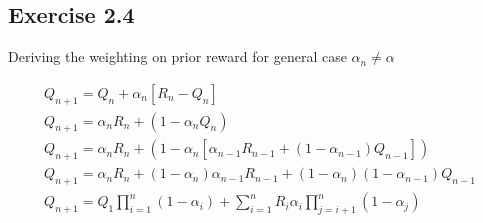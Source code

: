 \subsection{Exercise 2.4}
Deriving the weighting on prior reward for general case $\alpha_n \not= \alpha$

\begin{gather}
  Q_{n+1} = Q_n + \alpha_n[R_n - Q_n] \\
  Q_{n+1} = \alpha_nR_n + (1-\alpha_nQ_n) \\
  Q_{n+1} = \alpha_nR_n + (1-\alpha_n[\alpha_{n-1}R_{n-1} + (1-\alpha_{n-1})Q_{n-1}]) \\
  Q_{n+1} = \alpha_nR_n + (1-\alpha_n)\alpha_{n-1}R_{n-1} + (1-\alpha_n)(1-\alpha_{n-1})Q_{n-1} \\
  Q_{n+1} = Q_1\prod\limits_{i=1}^n(1-\alpha_i) + \sum\limits_{i=1}^nR_i\alpha_i\prod\limits_{j=i+1}^n(1-\alpha_j)
\end{gather}
